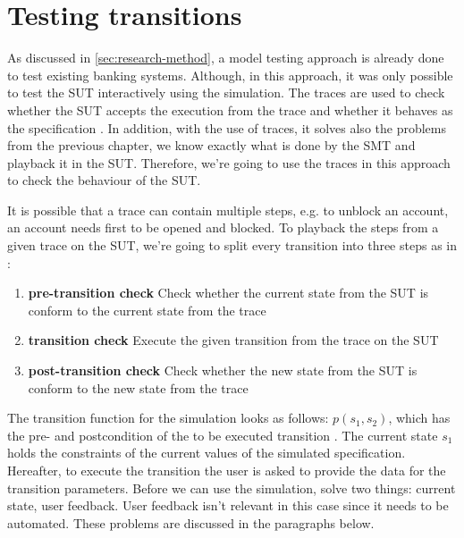 \section{Testing transitions}

As discussed in \autoref{sec:research-method}, a model testing approach is already done to test existing banking systems. Although, in this approach, it was only possible to test the SUT interactively using the simulation. The traces are used to check whether the SUT accepts the execution from the trace and whether it behaves as the specification \cite[p.5]{stoel_storm_vinju_bosman_2016}. In addition, with the use of traces, it solves also the problems from the previous chapter, we know exactly what is done by the SMT and playback it in the SUT. Therefore, we're going to use the traces in this approach to check the behaviour of the SUT.

It is possible that a trace can contain multiple steps, e.g. to unblock an account, an account needs first to be opened and blocked. To playback the steps from a given trace on the SUT, we're going to split every transition into three steps as in \cite{stoel_storm_vinju_bosman_2016}:
\begin{enumerate}
\item \textbf{pre-transition check} Check whether the current state from the SUT is conform to the current state from the trace
\item \textbf{transition check} Execute the given transition from the trace on the SUT
\item \textbf{post-transition check} Check whether the new state from the SUT is conform to the new state from the trace
\end{enumerate}

The transition function for the simulation looks as follows: $p(s_{1}, s_{2})$, which has the pre- and postcondition of the to be executed transition \cite[p.6]{stoel_storm_vinju_bosman_2016}. The current state $s_{1}$ holds the constraints of the current values of the simulated specification. Hereafter, to execute the transition the user is asked to provide the data for the transition parameters. Before we can use the simulation, solve two things: current state, user feedback. User feedback isn't relevant in this case since it needs to be automated. These problems are discussed in the paragraphs below.

